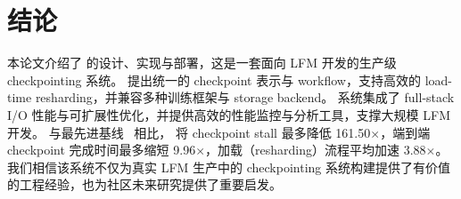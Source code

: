 \section{结论}
本论文介绍了 \sys{} 的设计、实现与部署，这是一套面向 LFM 开发的生产级 checkpointing 系统。
\sys{} 提出统一的 checkpoint 表示与 workflow，支持高效的 load-time resharding，并兼容多种训练框架与 storage backend。
系统集成了 full-stack I/O 性能与可扩展性优化，并提供高效的性能监控与分析工具，支撑大规模 LFM 开发。
与最先进基线~\cite{torch-dcp, megatron-dcp} 相比，\sys{} 将 checkpoint stall 最多降低 161.50$\times$，端到端 checkpoint 完成时间最多缩短 9.96$\times$，加载（resharding）流程平均加速 3.88$\times$。
我们相信该系统不仅为真实 LFM 生产中的 checkpointing 系统构建提供了有价值的工程经验，也为社区未来研究提供了重要启发。
